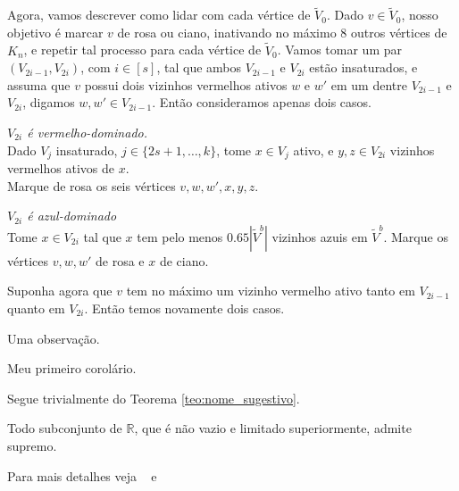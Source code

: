 Agora, vamos descrever como lidar com cada vértice de $\tilde{V}_0$. Dado $v\in \tilde{V}_0$, nosso objetivo é marcar $v$ de rosa ou ciano, inativando no máximo 8 outros vértices de $K_n$, e repetir tal processo para cada vértice de $\tilde{V}_0$.
Vamos tomar um par $(V_{2i-1},V_{2i})$, com $i\in[s]$, tal que ambos $V_{2i-1}$ e $V_{2i}$ estão insaturados, e assuma que $v$ possui dois vizinhos vermelhos ativos $w$ e $w'$ em um dentre $V_{2i-1}$ e $V_{2i}$, digamos $w,w'\in V_{2i-1}$. Então consideramos apenas dois casos.
\setcounter{caso}{0}
\begin{caso}
	\emph{$V_{2i}$ é vermelho-dominado.}\\
	Dado $V_j$ insaturado, $j\in\{2s+1,\dots,k\}$, tome $x\in V_j$ ativo, e $y,z\in V_{2i}$ vizinhos vermelhos ativos de $x$.\\
	Marque de rosa os seis vértices $v,w,w',x,y,z$.
\end{caso}

\begin{caso}
	\emph{$V_{2i}$ é azul-dominado}\\
	Tome $x\in V_{2i}$ tal que $x$ tem pelo menos $0.65|\tilde{V}^b|$ vizinhos azuis em $\tilde{V}^b$.
	Marque os vértices $v,w,w'$ de rosa e $x$ de ciano.
\end{caso}

Suponha agora que $v$ tem no máximo um vizinho vermelho ativo tanto em $V_{2i-1}$ quanto em $V_{2i}$. Então temos novamente dois casos.

\begin{obs}
  Uma observação.
\end{obs}

\begin{coro}
  Meu primeiro corolário.
\end{coro}

\begin{dem}
  Segue trivialmente do Teorema \ref{teo:nome_sugestivo}.
\end{dem}

\begin{axioma}
  Todo subconjunto de $\mathbb{R}$, que é não vazio e limitado
  superiormente, admite supremo.
\end{axioma}

Para mais detalhes veja ~\cite[p. nn]{Lvr} e ~\cite{Art}

